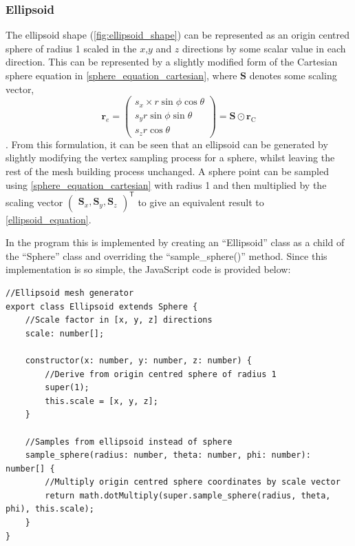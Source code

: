 \subsubsection{Ellipsoid}
The ellipsoid shape (\cref{fig:ellipsoid_shape}) can be represented as an origin centred sphere of radius 1 scaled in the $x$,$y$ and $z$ directions by some scalar value in each direction. This can be represented by a slightly modified form of the Cartesian sphere equation in \cref{sphere_equation_cartesian}, where $\mathbf{S}$ denotes some scaling vector,
\begin{equation}
\mathbf{r}_{e}=\begin{pmatrix}s_x \times r\sin\phi \cos\theta\\
s_y r\sin\phi \sin\theta\\
s_z r\cos\theta\end{pmatrix}
=\mathbf{S} \odot \mathbf{r}_\mathrm{C}
\label{ellipsoid_equation}
\end{equation}.
From this formulation, it can be seen that an ellipsoid can be generated by slightly modifying the vertex sampling process for a sphere, whilst leaving the rest of the mesh building process unchanged. A sphere point can be sampled using \cref{sphere_equation_cartesian} with radius 1 and then multiplied by the scaling vector $\begin{pmatrix}\mathbf{S}_x,\mathbf{S}_y,\mathbf{S}_z\end{pmatrix}^\mathsf{T}$ to give an equivalent result to \cref{ellipsoid_equation}.

In the program this is implemented by creating an ``Ellipsoid'' class as a child of the ``Sphere'' class and overriding the ``sample\_sphere()'' method. Since this implementation is so simple, the JavaScript code is provided below:

\begin{adjustbox}{width=\textwidth}
\begin{lstlisting}
//Ellipsoid mesh generator
export class Ellipsoid extends Sphere {
    //Scale factor in [x, y, z] directions
    scale: number[];

    constructor(x: number, y: number, z: number) {
        //Derive from origin centred sphere of radius 1
        super(1);
        this.scale = [x, y, z];
    }

    //Samples from ellipsoid instead of sphere
    sample_sphere(radius: number, theta: number, phi: number): number[] {
        //Multiply origin centred sphere coordinates by scale vector
        return math.dotMultiply(super.sample_sphere(radius, theta, phi), this.scale);
    }
}
\end{lstlisting}
\end{adjustbox}

